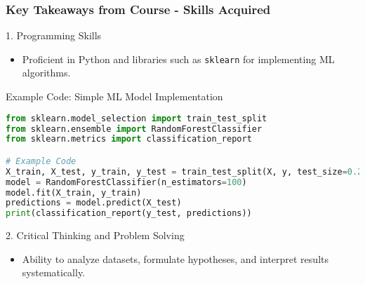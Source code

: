\documentclass[aspectratio=169]{beamer}
\begin{document}
\begin{frame}[fragile]
    \frametitle{Key Takeaways from Course - Skills Acquired}
    \begin{block}{1. Programming Skills}
        \begin{itemize}
            \item Proficient in Python and libraries such as \texttt{sklearn} for implementing ML algorithms.
        \end{itemize}
    \end{block}

    \begin{block}{Example Code: Simple ML Model Implementation}
        \begin{lstlisting}[language=Python]
from sklearn.model_selection import train_test_split
from sklearn.ensemble import RandomForestClassifier
from sklearn.metrics import classification_report

# Example Code
X_train, X_test, y_train, y_test = train_test_split(X, y, test_size=0.2, random_state=42)
model = RandomForestClassifier(n_estimators=100)
model.fit(X_train, y_train)
predictions = model.predict(X_test)
print(classification_report(y_test, predictions))
        \end{lstlisting}
    \end{block}

    \begin{block}{2. Critical Thinking and Problem Solving}
        \begin{itemize}
            \item Ability to analyze datasets, formulate hypotheses, and interpret results systematically.
        \end{itemize}
    \end{block}
\end{frame}
\end{document}
